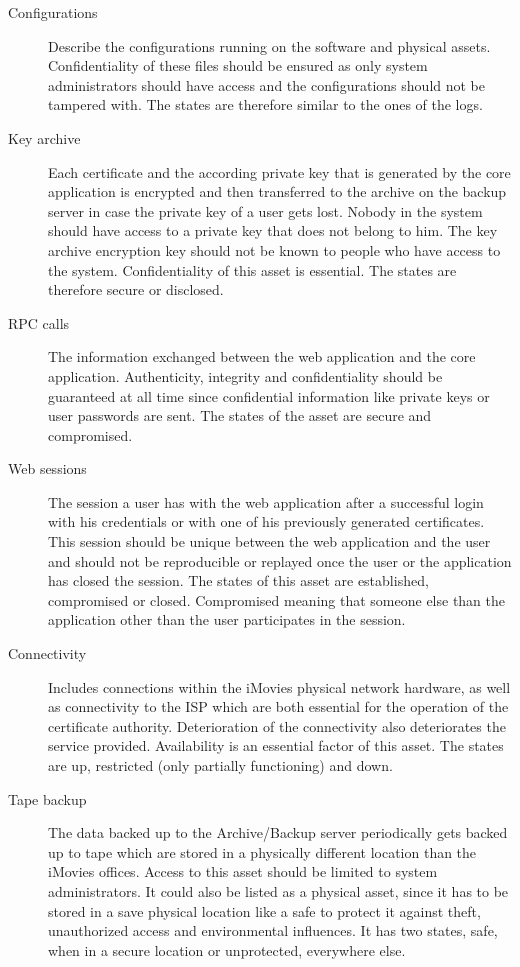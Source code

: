 \documentclass[a4paper, toc=index, 12pt, DIV14, twoside, BCOR2cm, headsepline, numbers=noenddot, bibliography=totoc]{scrbook}
\begin{document}
\begin{description}
\item[Configurations ] Describe the configurations running on the software and physical assets. Confidentiality of these files should be ensured as only system administrators should have access and the configurations should not be tampered with. The states are therefore similar to the ones of the logs.
\item[Key archive ] Each certificate and the according private key that is generated by the core application is encrypted and then transferred to the archive on the backup server in case the private key of a user gets lost. Nobody in the system should have access to a private key that does not belong to him. The key archive encryption key should not be known to people who have access to the system. Confidentiality of this asset is essential. The states are therefore secure or disclosed.
\item[RPC calls ] The information exchanged between the web application and the core application. Authenticity, integrity and confidentiality should be guaranteed at all time since confidential information like private keys or user passwords are sent. The states of the asset are secure and compromised.
\item[Web sessions ] The session a user has with the web application after a successful login with his credentials or with one of his previously generated certificates. This session should be unique between the web application and the user and should not be reproducible or replayed once the user or the application has closed the session. The states of this asset are established, compromised or closed. Compromised meaning that someone else than the application other than the user participates in the session.
\item[Connectivity ] Includes connections within the iMovies physical network hardware, as well as connectivity to the ISP which are both essential for the operation of the certificate authority. Deterioration of the connectivity also deteriorates the service provided. Availability is an essential factor of this asset. The states are up, restricted (only partially functioning) and down.
\item[Tape backup ] The data backed up to the Archive/Backup server periodically gets backed up to tape which are stored in a physically different location than the iMovies offices. Access to this asset should be limited to system administrators. It could also be listed as a physical asset, since it has to be stored in a save physical location like a safe to protect it against theft, unauthorized access and environmental influences. It has two states, safe, when in a secure location or unprotected, everywhere else.

\end{description}
\end{document}
